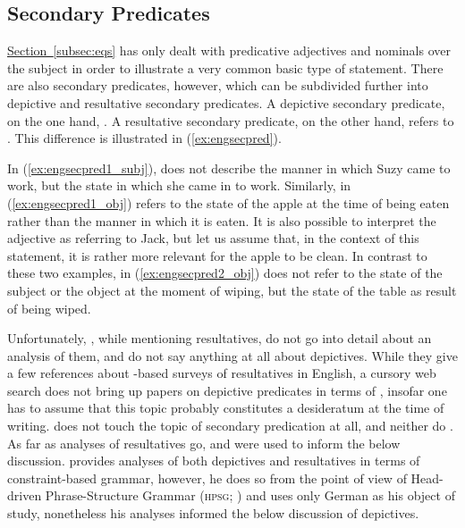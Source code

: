 \subsection{Secondary Predicates}
\label{subsec:secpred}

\hyperref[subsec:eqs]{Section~\ref*{subsec:eqs}} has only dealt with
predicative adjectives and nominals over the subject in order to illustrate a
very common basic type of statement. There are also secondary predicates,
however, which can be subdivided further into depictive and resultative
secondary predicates. A depictive secondary predicate, on the one hand,
. A resultative secondary predicate, on the other hand, refers to
. This difference is illustrated in (\ref{ex:engsecpred}).

\pex\label{ex:engsecpred}
\a\label{ex:engsecpred1_subj}%

\a\label{ex:engsecpred1_obj}%

\a\label{ex:engsecpred2_obj}%
\xe

In (\ref{ex:engsecpred1_subj}),  does not describe the manner in which
Suzy came to work, but the state in which she came in to work. Similarly, 
 in (\ref{ex:engsecpred1_obj}) refers to the state of the apple at
the time of being eaten rather than the manner in which it is eaten. It is also
possible to interpret the adjective as referring to Jack, but let us assume
that, in the context of this statement, it is rather more relevant for the
apple to be clean. In contrast to these two examples,  in
(\ref{ex:engsecpred2_obj}) does not refer to the state of the subject or the
object at the moment of wiping, but the state of the table as result of being
wiped.

Unfortunately, \citet[347]{bresnan2016}, while mentioning resultatives, do not
go into detail about an \Lfg{} analysis of them, and do not say anything at all
about depictives. While they give a few references about \Lfg{}-based surveys
of resultatives in English, a cursory web search does not bring up papers on
depictive predicates in terms of \Lfg{}, insofar one has to assume that this
topic probably constitutes a desideratum at the time of writing.
\citet{dalrymple2001} does not touch the topic of secondary predication at all,
and neither do \citet{butt1999}. As far as \Lfg{} analyses of resultatives go,
\citet{simpson1983} and \citet{christie2013} were used to inform the below
discussion. \textcites{mueller2002} provides analyses of both depictives and
resultatives in terms of constraint-based grammar, however, he does so from the
point of view of Head-driven Phrase-Structure Grammar (\textsc{hpsg};
\cite{pollardsag1994}) and uses only German as his object of study, nonetheless
his analyses informed the below discussion of depictives.


